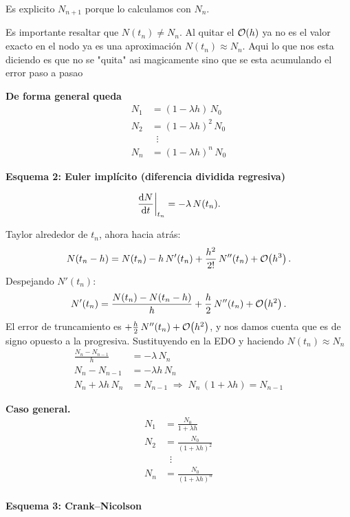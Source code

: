 
Es explicito $N_{n+1}$ porque lo calculamos con $N_n$.

Es importante resaltar que $N(t_n) \neq N_n$. Al quitar el $\mathcal{O}\!\left(h\right)$ ya no es el valor exacto en el nodo ya es una aproximación $N(t_n) \approx N_n$. Aqui lo que nos esta diciendo es que no se "quita" asi magicamente sino que se esta acumulando el error paso a pasao

\textbf{De forma general queda}
\begin{align*}
	N_1 &= (1 - \lambda h)\,N_0\\
	N_2 &= (1 - \lambda h)^2\,N_0\\
	&\;\;\vdots\\
	N_n &= (1 - \lambda h)^n\,N_0
\end{align*}


\textbf{Esquema 2: Euler implícito (diferencia dividida regresiva)}

\[
\left.\frac{\mathrm{d} N}{\mathrm{d} t}\right|_{t_n} = -\lambda\,N(t_n).
\]

Taylor alrededor de $t_n$, ahora hacia atrás:
\[
N(t_n - h) = N(t_n) - h\,N'(t_n) + \frac{h^2}{2!}\,N''(t_n) + \mathcal{O}\!\left(h^3\right).
\]
Despejando $N'(t_n)$:
\[
N'(t_n) = \frac{N(t_n) - N(t_n - h)}{h} + \frac{h}{2}\,N''(t_n) + \mathcal{O}\!\left(h^2\right).
\]
El error de truncamiento es $+\frac{h}{2}\,N''(t_n) + \mathcal{O}\!\left(h^2\right)$, y nos damos cuenta que es de signo opuesto a la progresiva. Sustituyendo en la EDO y haciendo $N(t_n) \approx N_n$
\begin{align*}
	\frac{N_n - N_{n-1}}{h} &= -\lambda\,N_n\\
	N_n - N_{n-1} &= -\lambda h\,N_n\\
	N_n + \lambda h\,N_n &= N_{n-1}
	\;\Longrightarrow\; N_n\,(1 + \lambda h) = N_{n-1}
\end{align*}


\textbf{Caso general.}
\begin{align*}
	N_1 &= \frac{N_0}{1 + \lambda h}\\
	N_2 &= \frac{N_0}{(1 + \lambda h)^2}\\
	&\;\;\vdots\\
	N_n &= \frac{N_0}{(1 + \lambda h)^n}
\end{align*}

\paragraph{Esquema 3: Crank--Nicolson}

